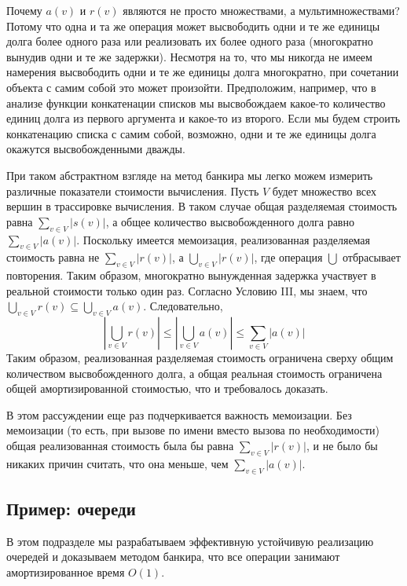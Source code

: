 Почему $a(v)$ и $r(v)$ являются не просто множествами, а
мультимножествами? Потому что одна и та же операция может высвободить
одни и те же единицы долга более одного раза или реализовать их более
одного раза (многократно вынудив одни и те же задержки). Несмотря на
то, что мы никогда не имеем намерения высвободить одни и те же единицы долга
многократно, при сочетании объекта с самим собой это может произойти.
Предположим, например, что в анализе функции конкатенации списков мы
высвобождаем какое-то количество единиц долга из первого аргумента и
какое-то из второго. Если мы будем строить конкатенацию списка с самим
собой, возможно, одни и те же единицы долга окажутся высвобожденными
дважды.

При таком абстрактном взгляде на метод банкира мы легко можем измерить
различные показатели стоимости вычисления. Пусть $V$ будет множество
всех вершин в трассировке вычисления. В таком случае общая разделяемая
стоимость равна $\sum_{v \in V}|s(v)|$, а общее количество
высвобожденного долга равно $\sum_{v \in V}|a(v)|$. Поскольку имеется
мемоизация, реализованная разделяемая стоимость равна не 
$\sum_{v \in V}|r(v)|$, а $\bigcup_{v \in V}|r(v)|$, где операция $\bigcup$
отбрасывает повторения. Таким образом, многократно вынужденная
задержка участвует в реальной стоимости только один раз. Согласно
Условию III, мы знаем, что 
$\bigcup_{v \in V}r(v) \subseteq \bigcup_{v \in V}
a(v)$. Следовательно,
$$
|\bigcup_{v \in V} r(v)| \le |\bigcup_{v \in V} a(v)| \le \sum_{v \in V} |a(v)|
$$
Таким образом, реализованная разделяемая стоимость ограничена сверху
общим количеством высвобожденного долга, а общая реальная стоимость
ограничена общей амортизированной стоимостью, что и требовалось
доказать.

\begin{remark}
  В этом рассуждении еще раз подчеркивается важность мемоизации. Без
  мемоизации (то есть, при вызове по имени вместо вызова по
  необходимости) общая реализованная стоимость была бы равна 
  $\sum_{v \in V} |r(v)|$, и не было бы никаких причин считать, что
  она меньше, чем $\sum_{v \in V} |a(v)|$.
\end{remark}

\subsection{Пример: очереди}
\label{sc:6.3.2}

В этом подразделе мы разрабатываем эффективную устойчивую реализацию
очередей и доказываем методом банкира, что все операции занимают амортизированное время
$O(1)$.

